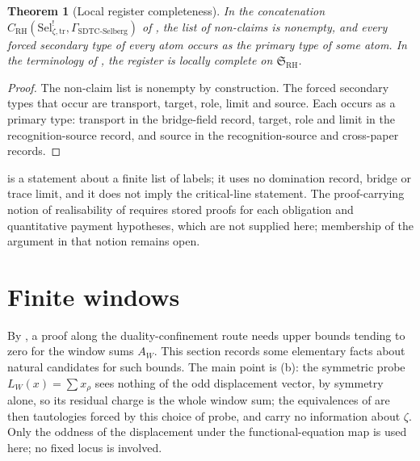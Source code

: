 \documentclass[11pt]{article}
\newcommand{\Sel}{\mathrm{Sel}^{!}_{\zeta,\mathrm{tr}}}
\newcommand{\GamSDTCSelberg}{\Gamma_{\mathrm{SDTC\text{-}Selberg}}}
\newtheorem{theorem}{Theorem}[section]
\theoremstyle{definition}
\begin{document}
\begin{theorem}[Local register completeness]
\label{thm:rh:aor-instance}
In the concatenation \(C_{\mathrm{RH}}(\Sel,\GamSDTCSelberg)\) of
,
the list of non-claims is nonempty, and every forced secondary type of
every atom occurs as the primary type of some atom.  In the terminology of \citet{TsiokosAOR2026}, the register
is locally complete on \(\mathfrak S_{\mathrm{RH}}\).
\end{theorem}

\begin{proof}
The non-claim list is nonempty by construction.  The
forced secondary types that occur are transport, target, role,
limit and source.  Each occurs as a primary type: transport in the bridge-field record,
target, role and limit in the recognition-source record, and source in
the recognition-source and cross-paper records.
\end{proof}

\begin{remark}
\label{rem:rh:aor-partial-status}
 is a statement about a finite list of
labels; it uses no domination record, bridge or trace limit, and it
does not imply the critical-line statement.  The proof-carrying notion
of realisability of \citet{TsiokosAOR2026} requires stored proofs for
each obligation and quantitative payment hypotheses, which are not
supplied here; membership of the argument in that notion remains open.
\end{remark}
 \section{Finite windows}
\label{sec:finite_windows}

By , a proof along the duality-confinement
route needs upper bounds tending to zero for the window sums \(A_W\).
This section records some elementary facts about natural candidates
for such bounds.  The main point is (b):
the symmetric probe \(L_W(x)=\sum x_\rho\) sees nothing of the odd
displacement vector, by symmetry alone, so its residual charge is the
whole window sum; the equivalences of
 are then tautologies forced by this
choice of probe, and carry no information about \(\zeta\).  Only the oddness of the displacement under the
functional-equation map is used here; no fixed locus is involved.
\end{document}
